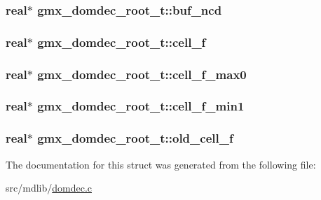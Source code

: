 \hypertarget{structgmx__domdec__root__t_a6f9f5c491826260b18483301e7e1de77}{
\subsubsection[{buf\-\_\-ncd}]{\setlength{\rightskip}{0pt plus 5cm}real$\ast$ {\bf gmx\-\_\-domdec\-\_\-root\-\_\-t\-::buf\-\_\-ncd}}}\label{structgmx__domdec__root__t_a6f9f5c491826260b18483301e7e1de77}
\hypertarget{structgmx__domdec__root__t_a468d5778bf03d77cd4c1a1003b62f757}{
\subsubsection[{cell\-\_\-f}]{\setlength{\rightskip}{0pt plus 5cm}real$\ast$ {\bf gmx\-\_\-domdec\-\_\-root\-\_\-t\-::cell\-\_\-f}}}\label{structgmx__domdec__root__t_a468d5778bf03d77cd4c1a1003b62f757}
\hypertarget{structgmx__domdec__root__t_a22976c3f27ed8b5e5e8d5fc1725b794f}{
\subsubsection[{cell\-\_\-f\-\_\-max0}]{\setlength{\rightskip}{0pt plus 5cm}real$\ast$ {\bf gmx\-\_\-domdec\-\_\-root\-\_\-t\-::cell\-\_\-f\-\_\-max0}}}\label{structgmx__domdec__root__t_a22976c3f27ed8b5e5e8d5fc1725b794f}
\hypertarget{structgmx__domdec__root__t_a93b85e31887b82cc7d9edfc6e7d18f4a}{
\subsubsection[{cell\-\_\-f\-\_\-min1}]{\setlength{\rightskip}{0pt plus 5cm}real$\ast$ {\bf gmx\-\_\-domdec\-\_\-root\-\_\-t\-::cell\-\_\-f\-\_\-min1}}}\label{structgmx__domdec__root__t_a93b85e31887b82cc7d9edfc6e7d18f4a}
\hypertarget{structgmx__domdec__root__t_a4db638ebdb9a007c9f5f67b7b92255fe}{
\subsubsection[{old\-\_\-cell\-\_\-f}]{\setlength{\rightskip}{0pt plus 5cm}real$\ast$ {\bf gmx\-\_\-domdec\-\_\-root\-\_\-t\-::old\-\_\-cell\-\_\-f}}}\label{structgmx__domdec__root__t_a4db638ebdb9a007c9f5f67b7b92255fe}


\-The documentation for this struct was generated from the following file\-:\begin{DoxyCompactItemize}
\item 
src/mdlib/\hyperlink{domdec_8c}{domdec.\-c}\end{DoxyCompactItemize}
